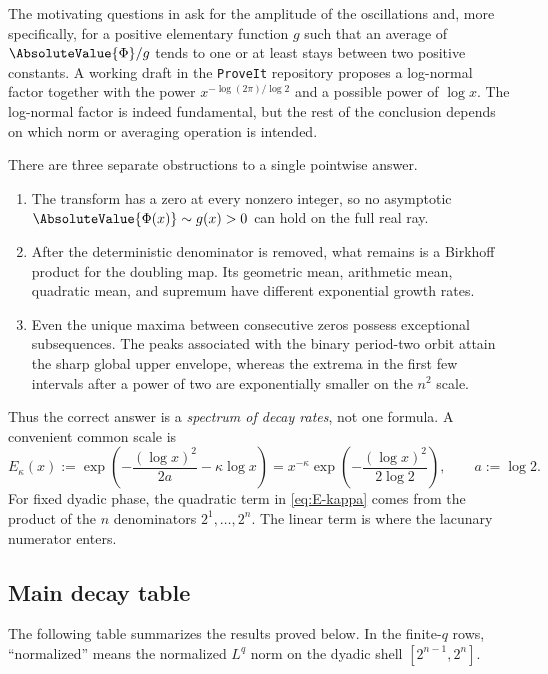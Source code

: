 \documentclass[11pt,oneside]{article}
\theoremstyle{definition}
\theoremstyle{remark}
\newcommand{\Phiup}{\Phi}
\begin{document}
The motivating questions in \cite{mse-extrema,mse-decay} ask for the amplitude of the
oscillations and, more specifically, for a positive elementary function $g$ such that an
average of $\AbsoluteValue{\Phiup}/g$ tends to one or at least stays between two positive constants.
A working draft in the \texttt{ProveIt} repository \cite{decay-draft} proposes a log-normal
factor together with the power $x^{-\log(2\pi)/\log2}$ and a possible power of $\log x$.
The log-normal factor is indeed fundamental, but the rest of the conclusion depends on
which norm or averaging operation is intended.

There are three separate obstructions to a single pointwise answer.

\begin{enumerate}
\item The transform has a zero at every nonzero integer, so no asymptotic
      $\AbsoluteValue{\Phiup(x)}\sim g(x)>0$ can hold on the full real ray.
\item After the deterministic denominator is removed, what remains is a Birkhoff product
      for the doubling map.  Its geometric mean, arithmetic mean, quadratic mean, and
      supremum have different exponential growth rates.
\item Even the unique maxima between consecutive zeros possess exceptional subsequences.
      The peaks associated with the binary period-two orbit attain the sharp global upper
      envelope, whereas the extrema in the first few intervals after a power of two are
      exponentially smaller on the $n^2$ scale.
\end{enumerate}

Thus the correct answer is a \emph{spectrum of decay rates}, not one formula.  A convenient
common scale is
\begin{equation}
 E_\kappa(x)
 :=\exp\!\left(-\frac{(\log x)^2}{2a}-\kappa\log x\right)
 =x^{-\kappa}\exp\!\left(-\frac{(\log x)^2}{2\log2}\right),
 \qquad a:=\log2.
 \label{eq:E-kappa}
\end{equation}
For fixed dyadic phase, the quadratic term in \eqref{eq:E-kappa} comes from the product of
the $n$ denominators $2^1,\dots,2^n$.  The linear term is where the lacunary numerator
enters.

\subsection{Main decay table}
\label{subsec:main-table}

The following table summarizes the results proved below.  In the finite-$q$ rows,
``normalized'' means the normalized $L^q$ norm on the dyadic shell
$[2^{n-1},2^n]$.
\end{document}
